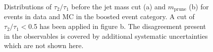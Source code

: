 \begin{figure}[hbtp]\begin{center}
 \caption{Distributions of $\tau_2/\tau_1$ before the jet mass cut (a)
   and $m_{\mathrm{prune}}$ (b) for events in data and MC in the boosted event category. 
 A cut of $\tau_2/\tau_1<$0.5 has been applied in figure b. The
 disagreement present in the observables is covered by additional
 systematic uncertainties which are not shown here.}
 \label{fig:boostvtagvars}\end{center}\end{figure}

